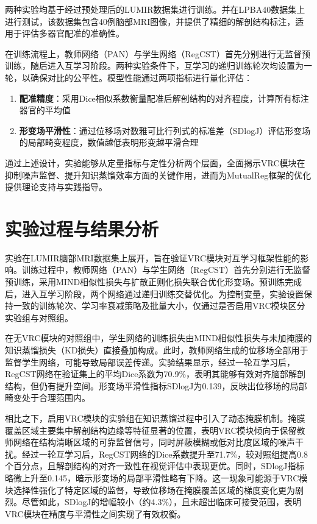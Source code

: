 两种实验均基于经过预处理后的LUMIR数据集进行训练。并在LPBA40数据集上进行测试，该数据集包含40例脑部MRI图像，并提供了精细的解剖结构标注，适用于评估多器官配准的准确性。

在训练流程上，教师网络（PAN）与学生网络（RegCST）首先分别进行无监督预训练，随后进入互学习阶段。两种实验条件下，互学习的递归训练轮次均设置为一轮，以确保对比的公平性。模型性能通过两项指标进行量化评估：

\begin{enumerate}
    \item \textbf{配准精度}：采用Dice相似系数衡量配准后解剖结构的对齐程度，计算所有标注器官的平均值
    \item \textbf{形变场平滑性}：通过位移场对数雅可比行列式的标准差（SDlogJ）评估形变场的局部畸变程度，数值越低表明形变越平滑合理
\end{enumerate}

通过上述设计，实验能够从定量指标与定性分析两个层面，全面揭示VRC模块在抑制噪声监督、提升知识蒸馏效率方面的关键作用，进而为MutualReg框架的优化提供理论支持与实践指导。

\section{实验过程与结果分析}

实验在LUMIR脑部MRI数据集上展开，旨在验证VRC模块对互学习框架性能的影响。训练过程中，教师网络（PAN）与学生网络（RegCST）首先分别进行无监督预训练，采用MIND相似性损失与扩散正则化损失联合优化形变场。预训练完成后，进入互学习阶段，两个网络通过递归训练交替优化。为控制变量，实验设置保持一致的训练轮次、学习率衰减策略及批量大小，仅通过是否启用VRC模块区分实验组与对照组。

在无VRC模块的对照组中，学生网络的训练损失由MIND相似性损失与未加掩膜的知识蒸馏损失（KD损失）直接叠加构成。此时，教师网络生成的位移场全部用于监督学生网络，可能导致局部误差传递。实验结果显示，经过一轮互学习后，RegCST网络在验证集上的平均Dice系数为70.9\%，表明其能够有效对齐脑部解剖结构，但仍有提升空间。形变场平滑性指标SDlogJ为0.139，反映出位移场的局部畸变处于合理范围内。

相比之下，启用VRC模块的实验组在知识蒸馏过程中引入了动态掩膜机制。掩膜覆盖区域主要集中解剖结构边缘等特征显著的位置，表明VRC模块倾向于保留教师网络在结构清晰区域的可靠监督信号，同时屏蔽模糊或低对比度区域的噪声干扰。经过一轮互学习后，RegCST网络的Dice系数提升至71.7\%，较对照组提高0.8个百分点，且解剖结构的对齐一致性在视觉评估中表现更优。同时，SDlogJ指标略微上升至0.145，暗示形变场的局部平滑性略有下降。这一现象可能源于VRC模块选择性强化了特定区域的监督，导致位移场在掩膜覆盖区域的梯度变化更为剧烈。尽管如此，SDlogJ的增幅较小（约4.3\%），且未超出临床可接受范围，表明VRC模块在精度与平滑性之间实现了有效权衡。


